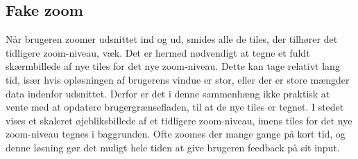 \subsection{Fake zoom}
\label{subsec:fakeZoom}

Når brugeren zoomer udsnittet ind og ud, smides alle de tiles, der tilhører det tidligere zoom-niveau, væk. Det er hermed nødvendigt at tegne et fuldt skærmbillede af nye tiles for det nye zoom-niveau. Dette kan tage relativt lang tid, især hvis opløsningen af brugerens vindue er stor, eller der er store mængder data indenfor udsnittet. Derfor er det i denne sammenhæng ikke praktisk at vente med at opdatere brugergrænsefladen, til at de nye tiles er tegnet. I stedet vises et skaleret øjebliksbillede af et tidligere zoom-niveau, imens tiles for det nye zoom-niveau tegnes i baggrunden. Ofte zoomes der mange gange på kort tid, og denne løsning gør det muligt hele tiden at give brugeren feedback på sit input.